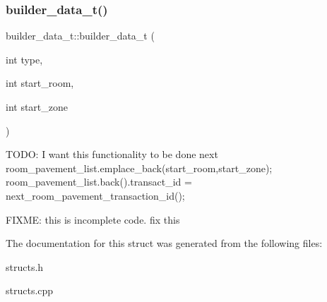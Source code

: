 \subsubsection{\texorpdfstring{builder\+\_\+data\+\_\+t()}{builder\_data\_t()}}
{\footnotesize\ttfamily builder\+\_\+data\+\_\+t\+::builder\+\_\+data\+\_\+t (\begin{DoxyParamCaption}\item[{int}]{type,  }\item[{int}]{start\+\_\+room,  }\item[{int}]{start\+\_\+zone }\end{DoxyParamCaption})}

T\+O\+DO\+: I want this functionality to be done next room\+\_\+pavement\+\_\+list.\+emplace\+\_\+back(start\+\_\+room,start\+\_\+zone); room\+\_\+pavement\+\_\+list.\+back().transact\+\_\+id = next\+\_\+room\+\_\+pavement\+\_\+transaction\+\_\+id();

F\+I\+X\+ME\+: this is incomplete code. fix this 

The documentation for this struct was generated from the following files\+:\begin{DoxyCompactItemize}
\item 
structs.\+h\item 
structs.\+cpp\end{DoxyCompactItemize}

